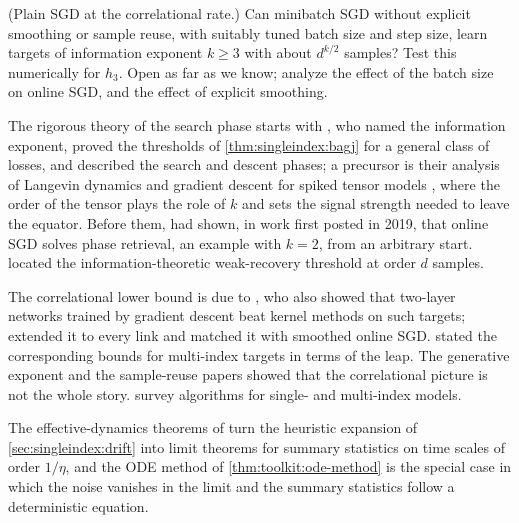 \begin{refsection}
\begin{exercises}
\item \research (Plain SGD at the correlational rate.) Can minibatch SGD without explicit smoothing or sample reuse, with suitably tuned batch size and step size, learn targets of information exponent $k\ge3$ with about $d^{k/2}$ samples? Test this numerically for $h_3$. Open as far as we know; \textcite{ArnaboldiEtAl2024b} analyze the effect of the batch size on online SGD, and \textcite{DamianEtAl2023} the effect of explicit smoothing.\label{ex:singleindex:minibatch}
\end{exercises}

\notesandrefs
The rigorous theory of the search phase starts with \textcite{BenArousGheissariJagannath2021}, who named the information exponent, proved the thresholds of \cref{thm:singleindex:bagj} for a general class of losses, and described the search and descent phases; a precursor is their analysis of Langevin dynamics and gradient descent for spiked tensor models \parencite{BenArousGheissariJagannath2020}, where the order of the tensor plays the role of $k$ and sets the signal strength needed to leave the equator. Before them, \textcite{TanVershynin2023} had shown, in work first posted in 2019, that online SGD solves phase retrieval, an example with $k=2$, from an arbitrary start. \Textcite{MondelliMontanari2019} located the information-theoretic weak-recovery threshold at order $d$ samples.

The correlational lower bound is due to \textcite{DamianLeeSoltanolkotabi2022}, who also showed that two-layer networks trained by gradient descent beat kernel methods on such targets; \textcite{DamianEtAl2023} extended it to every link and matched it with smoothed online SGD. \Textcite{AbbeBoixAdseraMisiakiewicz2023} stated the corresponding bounds for multi-index targets in terms of the leap. The generative exponent \parencite{DamianEtAl2024} and the sample-reuse papers \parencite{DandiEtAl2024,LeeEtAl2024,ArnaboldiEtAl2024a} showed that the correlational picture is not the whole story. \Textcite{BrunaHsu2025} survey algorithms for single- and multi-index models.

The effective-dynamics theorems of \textcite{BenArousGheissariJagannath2022} turn the heuristic expansion of \cref{sec:singleindex:drift} into limit theorems for summary statistics on time scales of order $1/\eta$, and the ODE method of \cref{thm:toolkit:ode-method} is the special case in which the noise vanishes in the limit and the summary statistics follow a deterministic equation.


\end{refsection}
